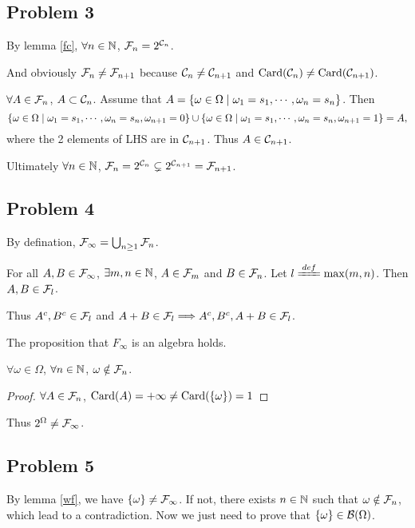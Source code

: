 \documentclass{article}
\begin{document}
\subsection*{\centering Problem 3}
By lemma \ref{fc}, $\forall n\in\mathbb{N}$, $\mathcal{F}_n=2^{\mathcal{C}_n}$.

And obviously $\mathcal{F}_n\ne \mathcal{F}_{n+1}$ because $\mathcal{C}_n\ne \mathcal{C}_{n+1}$ and $\text{Card}(\mathcal{C}_n)\ne \text{Card}(\mathcal{C}_{n+1})$.

$\forall A\in\mathcal{F}_n$, $A\subset\mathcal{C}_n$. Assume that $A=\{\omega\in\Omega\mid\omega_1=s_1, \cdots, \omega_n=s_n\}$. Then
\[
	\{\omega\in\Omega\mid\omega_1=s_1, \cdots, \omega_n=s_n,\omega_{n+1}=0\}
	\cup
	\{\omega\in\Omega\mid\omega_1=s_1, \cdots, \omega_n=s_n,\omega_{n+1}=1\}
	=A
,\]
where the 2 elements of LHS are in $\mathcal{C}_{n+1}$. Thus  $A\in\mathcal{C}_{n+1}$.

Ultimately $\forall n\in\mathbb{N}$, $\mathcal{F}_n=2^{\mathcal{C}_n}\subsetneq 2^{\mathcal{C}_{n+1}}=\mathcal{F}_{n+1}$.

\subsection*{\centering Problem 4}
By defination, $\mathcal{F}_\infty=\bigcup_{n\ge 1}\mathcal{F}_n$.

For all $A,B\in\mathcal{F}_\infty$, $\exists m,n\in\mathbb{N}$, $A\in\mathcal{F}_m$ and $B\in\mathcal{F}_n$. Let  $l\deq\max(m,n)$. Then  $A,B\in\mathcal{F}_l$.

Thus $A^c,B^c\in\mathcal{F}_l$ and  $A+B\in\mathcal{F}_l\Longrightarrow A^c,B^c,A+B\in\mathcal{F}_l$.

The proposition that $F_\infty$ is an algebra holds.

\begin{lemma}
	$\forall\omega\in\Omega$, $\forall n\in\mathbb{N}$, $\omega\notin\mathcal{F}_n$.
	\label{wf}
\end{lemma}
\begin{proof}
	$\forall A\in\mathcal{F}_n$, $\text{Card}(A)=+\infty\ne \text{Card}(\{\omega\})=1$
\end{proof}
Thus $2^{\Omega}\ne\mathcal{F}_\infty$.


\subsection*{\centering Problem 5}
By lemma \ref{wf}, we have $\{\omega\}\ne\mathcal{F}_\infty$. If not, there exists $n\in\mathbb{N}$ such that  $\omega\notin\mathcal{F}_n$, which lead to a contradiction.
Now we just need to prove that  $\{\omega\}\in\mathcal{B}(\Omega)$.



\subsection*{}
\subsection*{}
\end{document}
